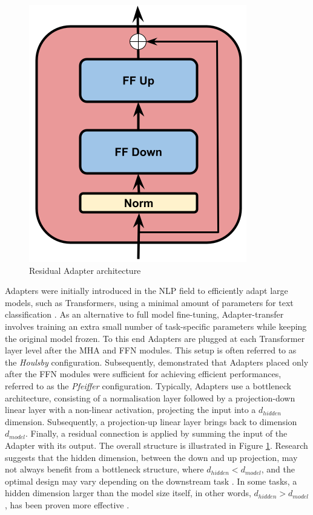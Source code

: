 \begin{figure}[t]
    \begin{center}
    \includegraphics[scale=0.3]{imgs/Adapter_alone.png}
    \caption{Residual Adapter architecture}
    \label{fig:Adapter_architecture}
    \end{center}
    \end{figure}


Adapters were initially introduced in the \ac{NLP} field to efficiently adapt large models, such as Transformers, using a minimal amount of parameters for text classification \cite{houlsby}. As an alternative to full model fine-tuning, Adapter-transfer involves training an extra small number of task-specific parameters while keeping the original model frozen. To this end Adapters are plugged at each Transformer layer level after the \ac{MHA} and \ac{FFN} modules. This setup is often referred to as the \textit{Houlsby} configuration. Subsequently, \cite{pfeiffer} demonstrated that Adapters placed only after the \ac{FFN} modules were sufficient for achieving efficient performances, referred to as the \textit{Pfeiffer} configuration. Typically, Adapters use a bottleneck architecture, consisting of a normalisation layer followed by a projection-down linear layer with a non-linear activation, projecting the input into a $d_{hidden}$ dimension. Subsequently, a projection-up linear layer brings back to dimension $d_{model}$. Finally, a residual connection is applied by summing the input of the Adapter with its output. The overall structure is illustrated in Figure \ref{fig:Adapter_architecture}. Research suggests that the hidden dimension, between the down and up projection, may not always benefit from a bottleneck structure, where $d_{hidden} < d_{model}$, and the optimal design may vary depending on the downstream task \cite{houlsby}. In some tasks, a hidden dimension larger than the model size itself, in other words, $d_{hidden} > d_{model}$, has been proven more effective \cite{fan2022draft}.

